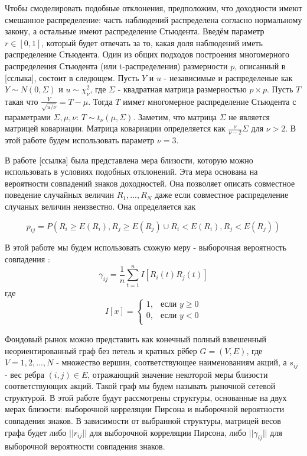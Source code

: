 Чтобы смоделировать подобные отклонения, предположим, что доходности имеют смешанное распределение: часть наблюдений распределена согласно нормальному закону, а остальные имеют распределение Стьюдента. Введём параметр $r \in [0,1]$, который будет отвечать за то, какая доля наблюдений иметь распределение Стьюдента.
Один из общих подходов построения многомерного распределения Стьюдента (или t-распределения) размерности $p$, описанный в [сслыка], состоит в следющем. Пусть $Y$ и $u$ - независимые и распределеные как $Y \sim N(0, \Sigma)$ и $u\sim\chi_\nu^2$, где $\Sigma$ - квадратная матрица размерностью $p \times p$. Пусть $T$ такая что $\frac{Y}{\sqrt{u/\nu}} = T - \mu $. Тогда $T$ иммет многомерное распределение Стьюдента с параметрами $\Sigma, \mu, \nu$:  $T \sim t_\nu(\mu, \Sigma)$. Заметим, что матрица $\Sigma$ не является матрицей ковариации. Матрица ковариации определяется как $\frac{\nu}{\nu-2}\Sigma$ для $\nu > 2$. В этой работе будем использовать параметр $\nu = 3$.
	
	
В работе [ссылка] была представлена мера близости, которую можно использовать  в условиях подобных отклонений. Эта мера основана на вероятности совпадений знаков доходностей. Она позволяет описать совместное поведение случайных величин $R_1, ..., R_N$ даже если совместное распределение случаных величин неизвестно. Она определяется как

\begin{equation}
	p_{i j} = P(R_i \geq E(R_i), R_j \geq E(R_j) \cup R_i < E(R_i), R_j < E(R_j))
\end{equation}

В этой работе мы будем использовать схожую меру - выборочная вероятность совпадения :
\begin{equation}
	\gamma_{i j} = \frac{1}{n}\sum_{t=1}^{n}I[R_i(t)R_j(t)]
\end{equation}
где 
\begin{equation*}
  I[x] =
    \begin{cases}
      1, & \text{если $y \geq 0 $}\\
      0, & \text{если $y < 0 $}\\
    \end{cases}       
\end{equation*}


Фондовый рынок можно представить как конечный полный взвешенный неориентированный граф без петель и кратных рёбер $G=(V,E)$, где $V={1,2,...,N}$  - множество вершин, соответствующее наименованиям акций, а $s_{i j}$ - вес ребра $(i,j) \in E$, отражающий значение некоторой меры близости соответствующих акций. Такой граф мы будем называть рыночной сетевой структурой. В этой работе будут рассмотрены структуры, основанные на двух мерах близости: выборочной корреляции Пирсона и выборочной вероятности совпадения знаков.  В зависимости от выбранной структуры, матрицей весов графа будет либо $||r_{i j}||$  для выборочной корреляции Пирсона, либо $||\gamma_{i j}||$  для выборочной вероятности совпадения знаков.


